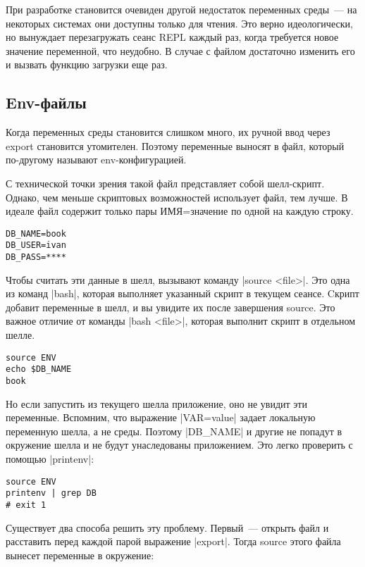 При разработке становится очевиден другой недостаток переменных среды~--- на
некоторых системах они доступны только для чтения. Это верно идеологически, но
вынуждает перезагружать сеанс REPL каждый раз, когда требуется новое значение
переменной, что неудобно. В случае с файлом достаточно изменить его и вызвать
функцию загрузки еще раз.

\subsection{Env-файлы}

Когда переменных среды становится слишком много, их ручной ввод через export
становится утомителен. Поэтому переменные выносят в файл, который по-другому
называют env-конфигурацией.

С технической точки зрения такой файл представляет собой шелл-скрипт. Однако,
чем меньше скриптовых возможностей использует файл, тем лучше. В идеале файл
содержит только пары ИМЯ=значение по одной на каждую строку.

\begin{verbatim}
DB_NAME=book
DB_USER=ivan
DB_PASS=****
\end{verbatim}

Чтобы считать эти данные в шелл, вызывают команду \spverb|source <file>|. Это одна из
команд \spverb|bash|, которая выполняет указанный скрипт в текущем сеансе. Cкрипт
добавит переменные в шелл, и вы увидите их после завершения source. Это важное
отличие от команды \spverb|bash <file>|, которая выполнит скрипт в отдельном шелле.

\begin{verbatim}
source ENV
echo $DB_NAME
book
\end{verbatim}

Но если запустить из текущего шелла приложение, оно не увидит эти
переменные. Вспомним, что выражение \spverb|VAR=value| задает локальную переменную
шелла, а не среды. Поэтому \spverb|DB_NAME| и другие не попадут в окружение шелла и не
будут унаследованы приложением. Это легко проверить с помощью \spverb|printenv|:

\begin{verbatim}
source ENV
printenv | grep DB
# exit 1
\end{verbatim}

Существует два способа решить эту проблему. Первый~--- открыть файл и расставить
перед каждой парой выражение \spverb|export|. Тогда source этого файла вынесет
переменные в окружение:

